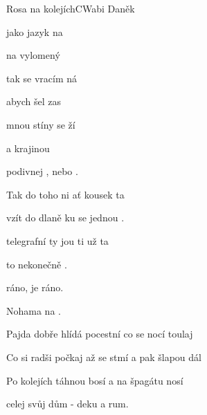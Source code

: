\begin{song}{Rosa na kolejích}{C}{Wabi Daněk}

\begin{SBVerse}

 jako jazyk  na

na vylomený 

tak se vracím  ná

abych šel zas 

 mnou stíny se ží

a  krajinou 

podivnej , nebo .

\end{SBVerse}

\begin{SBChorus}

Tak do toho ni ať  kousek ta

vzít do dlaně ku se jednou .

telegrafní ty jou ti už ta

to nekonečně  .

 ráno, je ráno.

Nohama   na .

\end{SBChorus}

\begin{SBVerse}

Pajda dobře hlídá pocestní co se nocí toulaj

Co si radši počkaj až se stmí a pak šlapou dál

Po kolejích táhnou bosí a na špagátu nosí

celej svůj dům - deku a rum.

\end{SBVerse}

\begin{SBChorus}

\end{SBChorus}

\end{song}

\clearpage
